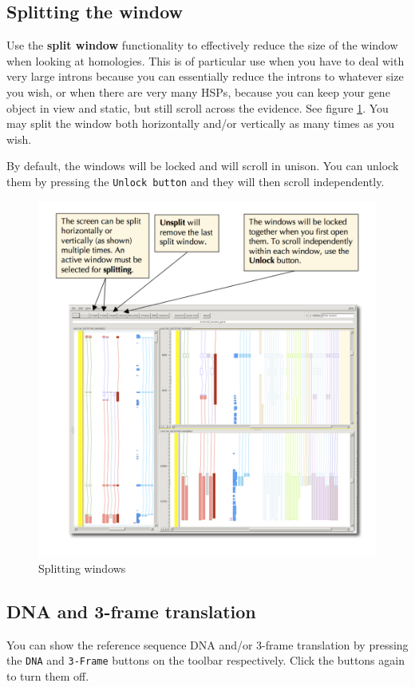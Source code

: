 \documentclass[letterpaper]{article}
\begin{document}
\subsection{Splitting the window} \label{sec_split}
Use the \textbf{split window} functionality to effectively reduce the size of the window when looking at homologies. This is of particular use when you have to deal with very large introns because you can essentially reduce the introns to whatever size you wish, or when there are very many HSPs, because you can keep your gene object in view and static, but still scroll across the evidence. See figure \ref{img_split_window}. You may split the window both horizontally and/or vertically as many times as you wish.

By default, the windows will be locked and will scroll in unison. You can unlock them by pressing the \lstinline{Unlock button} and they will then scroll independently.

\begin{figure}
\centering
\color[rgb]{0.30980393,0.5058824,0.7411765}
\includegraphics[width=15.231cm]{img_split_window.png}
\caption{Splitting windows}
\label{img_split_window}
\end{figure}


\subsection{DNA and 3-frame translation} \label{sec_dna_3_frame}
You can show the reference sequence DNA and/or 3-frame translation by pressing the \lstinline{DNA} and \lstinline{3-Frame} buttons on the toolbar respectively. Click the buttons again to turn them off.
\end{document}
